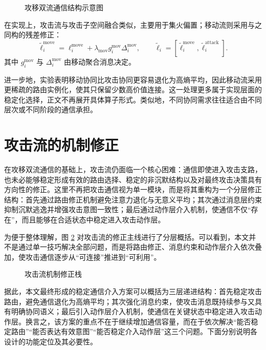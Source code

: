 \begin{figure}[htbp]
    \centering
    \resizebox{0.98\textwidth}{!}{}
    \caption{攻移双流通信结构示意图}
    \label{fig:dualstream_structure}
\end{figure}

在实现上，攻击流与攻击子空间融合类似，主要用于集火偏置；移动流则采用与之同构的残差修正：
\begin{equation}
\tilde{\ell}_i^{\text{move}}=
\ell_i^{\text{move}}+\lambda_{\text{mov}}g_i^{\text{mov}}\Delta_i^{\text{mov}},
\qquad
\tilde{\ell}_i=
\left[
\tilde{\ell}_i^{\text{move}},
\tilde{\ell}_i^{\text{attack}}
\right].
\end{equation}
其中 \(g_i^{\text{mov}}\) 与 \(\Delta_i^{\text{mov}}\) 由移动聚合消息决定。

进一步地，实验表明移动协同比攻击协同更容易退化为高熵平均，因此移动流采用更稀疏的路由实例化，使其只保留少数高价值连接。这一处理更多属于实现层面的稳定化选择，正文不再展开具体算子形式。类似地，不同协同需求往往适合由不同层次或不同阶段的通信承担。

\section{攻击流的机制修正}

在攻移双流通信的基础上，攻击流仍面临一个核心困难：通信即使进入攻击支路，也未必能够稳定形成有效的路由选择、稳定的非沉默结构以及对最终攻击决策具有方向性的修正。这里不再把攻击通信视为单一模块，而是将其重构为一个分层修正结构：首先通过路由修正机制避免注意力退化与无意义平均；其次通过消息层约束抑制沉默逃逸并增强攻击意图一致性；最后通过动作层介入机制，使通信不仅“存在”，而且能够在合适状态中稳定进入攻击动作层。

为便于整体理解，图 \ref{fig:attack_refinement_stack} 对攻击流的修正主线进行了分层概括。可以看到，本文并不是通过单一技巧解决全部问题，而是将路由修正、消息约束和动作层介入依次叠加，使攻击通信逐步从“可连接”推进到“可利用”。

\begin{figure}[htbp]
    \centering
    \resizebox{0.95\textwidth}{!}{}
    \caption{攻击流机制修正栈}
    \label{fig:attack_refinement_stack}
\end{figure}

据此，本文最终形成的稳定通信介入方案可以概括为三层递进结构：首先稳定攻击路由，避免通信退化为高熵平均；其次强化消息约束，使攻击消息既持续参与又具有明确协同语义；最后引入动作层介入机制，使通信在关键状态中稳定进入攻击动作层。换言之，该方案的重点不在于继续增加通信容量，而在于依次解决“能否稳定路由”“能否表达有效意图”“能否稳定介入动作层”这三个问题。下面分别说明各设计的功能定位及其必要性。

